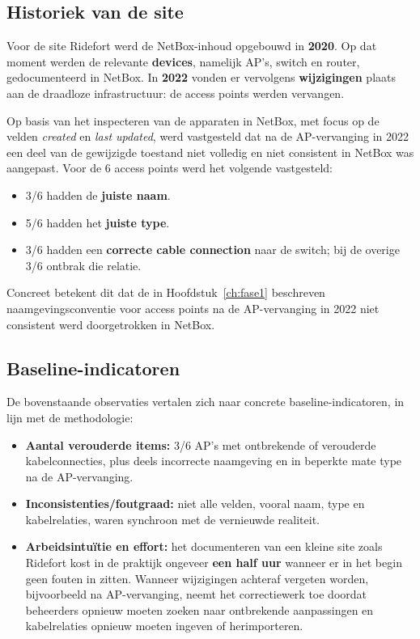 \subsection{Historiek van de site}

Voor de site Ridefort werd de NetBox-inhoud opgebouwd in \textbf{2020}. Op dat moment werden de relevante \textbf{devices}, namelijk AP's, switch en router, gedocumenteerd in NetBox. In \textbf{2022} vonden er vervolgens \textbf{wijzigingen} plaats aan de draadloze infrastructuur: de access points werden vervangen.

Op basis van het inspecteren van de apparaten in NetBox, met focus op de velden \emph{created} en \emph{last updated}, werd vastgesteld dat na de AP-vervanging in 2022 een deel van de gewijzigde toestand niet volledig en niet consistent in NetBox was aangepast. Voor de 6 access points werd het volgende vastgesteld:

\begin{itemize}
  \item 3/6 hadden de \textbf{juiste naam}.
  \item 5/6 hadden het \textbf{juiste type}.
  \item 3/6 hadden een \textbf{correcte cable connection} naar de switch; bij de overige 3/6 ontbrak die relatie.
\end{itemize}

Concreet betekent dit dat de in Hoofdstuk~\ref{ch:fase1} beschreven naamgevingsconventie voor access points na de AP-vervanging in 2022 niet consistent werd doorgetrokken in NetBox.

\subsection{Baseline-indicatoren}

De bovenstaande observaties vertalen zich naar concrete baseline-indicatoren, in lijn met de methodologie:

\begin{itemize}
  \item \textbf{Aantal verouderde items:} 3/6 AP's met ontbrekende of verouderde kabelconnecties, plus deels incorrecte naamgeving en in beperkte mate type na de AP-vervanging.
  \item \textbf{Inconsistenties/foutgraad:} niet alle velden, vooral naam, type en kabelrelaties, waren synchroon met de vernieuwde realiteit.
  \item \textbf{Arbeidsintuïtie en effort:} het documenteren van een kleine site zoals Ridefort kost in de praktijk ongeveer \textbf{een half uur} wanneer er in het begin geen fouten in zitten. Wanneer wijzigingen achteraf vergeten worden, bijvoorbeeld na AP-vervanging, neemt het correctiewerk toe doordat beheerders opnieuw moeten zoeken naar ontbrekende aanpassingen en kabelrelaties opnieuw moeten ingeven of herimporteren.
\end{itemize}

